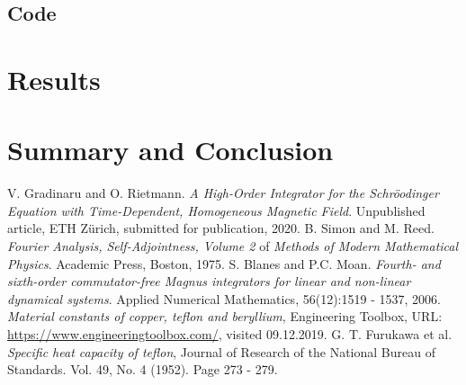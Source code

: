 \documentclass{article}
\begin{document}
\subsection{Code}

\lstset{style=mystyle}





\section{Results}

\section{Summary and Conclusion}

\begin{thebibliography}{9}
  V. Gradinaru and O. Rietmann.
  \textit{A High-Order Integrator for the
          Schr{\"o}odinger Equation with Time-Dependent,
          Homogeneous Magnetic Field}.
  Unpublished article, ETH Z{\"u}rich, submitted for publication, 2020.
  B. Simon and M. Reed.
  \textit{Fourier Analysis, Self-Adjointness, Volume 2} of \textit{Methods of Modern Mathematical Physics}.
  Academic Press, Boston, 1975.
  S. Blanes and P.C. Moan.
  \textit{Fourth- and sixth-order commutator-free Magnus integrators for linear and non-linear dynamical systems}.
  Applied Numerical Mathematics, 56(12):1519 - 1537, 2006.
  \textit{Material constants of copper, teflon and beryllium},
  Engineering Toolbox, URL: \url{https://www.engineeringtoolbox.com/}, visited 09.12.2019.
  G. T. Furukawa et al.
  \textit{Specific heat capacity of teflon},
  Journal of Research of the National Bureau of Standards. Vol. 49, No. 4 (1952). Page 273 - 279.


\end{thebibliography}
\end{document}
